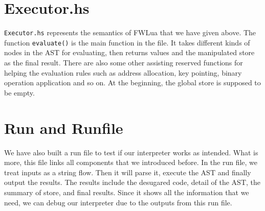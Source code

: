 \section{Executor.hs}
{\tt Executor.hs} represents the semantics of FWLua that we have given above. The function {\tt evaluate()} is the main function in the file. It takes different kinds of nodes in the AST for evaluating, then returns values and the manipulated store as the final result. There are also some other assisting reserved functions for helping the evaluation rules
such as address allocation, key pointing, binary operation application and so on. At the beginning, the global store is supposed to be empty.

\section{Run and Runfile}
We have also built a run file to test if our interpreter works as intended. What is more, this file links all components that we introduced before. In the run file, we treat inputs as a string flow. Then it will parse it, execute the AST and finally output the results. The results include the desugared code, detail of the AST, the summary of store, and final results. Since it shows all the information that we need, we can debug our interpreter due to the outputs from this run file.
